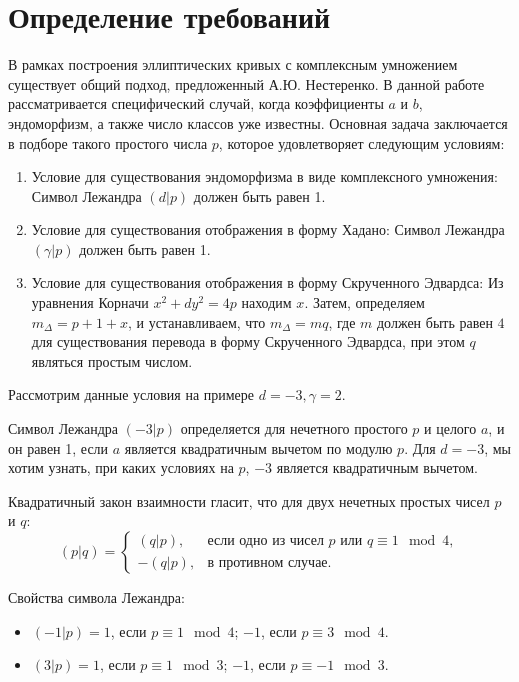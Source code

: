 \section*{Определение требований}

В рамках построения эллиптических кривых с комплексным умножением существует общий подход, предложенный А.Ю. Нестеренко. В данной работе рассматривается специфический случай, когда коэффициенты \( a \) и \( b \), эндоморфизм, а также число классов уже известны. Основная задача заключается в подборе такого простого числа \( p \), которое удовлетворяет следующим условиям:

\begin{enumerate}
    \item Условие для существования эндоморфизма в виде комплексного умножения: Символ Лежандра \((d|p)\) должен быть равен 1.
    \item Условие для существования отображения в форму Хадано: Символ Лежандра \((\gamma|p)\) должен быть равен 1.
    \item Условие для существования отображения в форму Скрученного Эдвардса: Из уравнения Корначи \(x^2 + dy^2 = 4p\) находим \(x\). Затем, определяем \(m_{\Delta} = p + 1 + x\), и устанавливаем, что \(m_{\Delta} = mq\), где \(m\) должен быть равен \(4\) для существования перевода в форму Скрученного Эдвардса, при этом \(q\) являться простым числом.
\end{enumerate}

Рассмотрим данные условия на примере \( d = -3, \gamma = 2 \).

Символ Лежандра \((-3|p)\) определяется для нечетного простого \(p\) и целого \(a\), и он равен 1, если \(a\) является квадратичным вычетом по модулю \(p\). Для \(d = -3\), мы хотим узнать, при каких условиях на \(p\), \(-3\) является квадратичным вычетом.

Квадратичный закон взаимности гласит, что для двух нечетных простых чисел \(p\) и \(q\):
\[
(p|q) =
\begin{cases}
(q|p), & \text{если одно из чисел } p \text{ или } q \equiv 1 \mod 4,\\
-(q|p), & \text{в противном случае}.
\end{cases}
\]

Свойства символа Лежандра:
\begin{itemize}
\item \( (-1|p) = 1 \), если \( p \equiv 1 \mod 4 \); \( -1 \), если \( p \equiv 3 \mod 4 \).
\item \( (3|p) = 1 \), если \( p \equiv 1 \mod 3 \); \( -1 \), если \( p \equiv -1 \mod 3 \).
\end{itemize}

